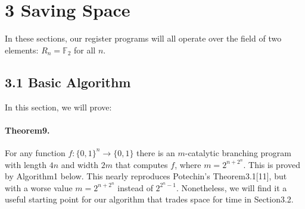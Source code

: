 \section*{3 Saving Space}
In these sections, our register programs will all operate over the field of two elements: $R_n=\mathbb F_2$ for all $n$.
\subsection*{3.1 Basic Algorithm}
In this section, we will prove:
\paragraph{Theorem9.} For any function $f:\{0,1\}^n\to\{0,1\}$ there is an $m$-catalytic branching program with length $4n$ and width $2m$ that computes $f$, where $m=2^{n+2^n}$.
This is proved by Algorithm1 below. This nearly reproduces Potechin's Theorem3.1[11], but with a worse value $m=2^{n+2^n}$ instead of $2^{2^n-1}$. Nonetheless, we will find it a useful starting point for our algorithm that trades space for time in Section3.2.
